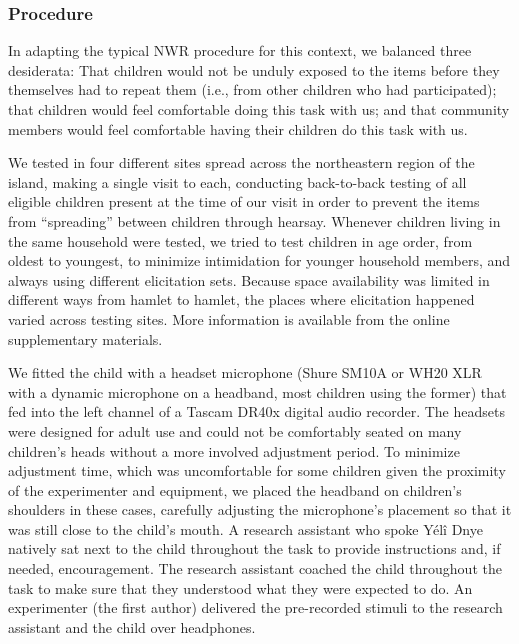 \documentclass[english,,man,floatsintext]{apa6}
\begin{document}
\hypertarget{procedure}{%
\subsubsection{Procedure}\label{procedure}}

In adapting the typical NWR procedure for this context, we balanced three desiderata: That children would not be unduly exposed to the items before they themselves had to repeat them (i.e., from other children who had participated); that children would feel comfortable doing this task with us; and that community members would feel comfortable having their children do this task with us.

We tested in four different sites spread across the northeastern region of the island, making a single visit to each, conducting back-to-back testing of all eligible children present at the time of our visit in order to prevent the items from \enquote{spreading} between children through hearsay. Whenever children living in the same household were tested, we tried to test children in age order, from oldest to youngest, to minimize intimidation for younger household members, and always using different elicitation sets. Because space availability was limited in different ways from hamlet to hamlet, the places where elicitation happened varied across testing sites. More information is available from the online supplementary materials.

We fitted the child with a headset microphone (Shure SM10A or WH20 XLR with a dynamic microphone on a headband, most children using the former) that fed into the left channel of a Tascam DR40x digital audio recorder. The headsets were designed for adult use and could not be comfortably seated on many children's heads without a more involved adjustment period. To minimize adjustment time, which was uncomfortable for some children given the proximity of the experimenter and equipment, we placed the headband on children's shoulders in these cases, carefully adjusting the microphone's placement so that it was still close to the child's mouth. A research assistant who spoke Yélî Dnye natively sat next to the child throughout the task to provide instructions and, if needed, encouragement. The research assistant coached the child throughout the task to make sure that they understood what they were expected to do. An experimenter (the first author) delivered the pre-recorded stimuli to the research assistant and the child over headphones.
\end{document}
